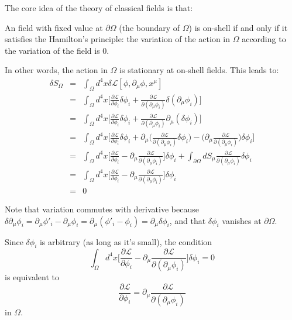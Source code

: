 \documentclass[12pt]{book}
\begin{document}
	The core idea of the theory of classical fields is that: 
	
	An field with fixed value at  $\partial\Omega$ (the boundary of $\Omega$) is on-shell if and only if it satisfies the  Hamilton's principle: the variation of the action in $\Omega$ according to the variation of the field is 0. 
	
	In other words, the action in $\Omega$ is stationary at on-shell fields. This leads to:
	\begin{eqnarray}
		\delta S_\Omega&=&\int_{\Omega}d^4x\delta\mathcal{L}[\phi,\partial_\mu\phi,x^\mu] \\
		&=&\int_{\Omega}d^4x\Big[\frac{\partial\mathcal{L}}{\partial\phi_i}\delta\phi_i+\frac{\partial\mathcal{L}}{\partial(\partial_\mu\phi_i)}\delta(\partial_\mu\phi_i)\Big]\\
		&=&\int_{\Omega}d^4x\Big[\frac{\partial\mathcal{L}}{\partial\phi_i}\delta\phi_i+\frac{\partial\mathcal{L}}{\partial(\partial_\mu\phi_i)}\partial_\mu(\delta\phi_i)\Big]\\
		&=&\int_{\Omega}d^4x\Big[\frac{\partial\mathcal{L}}{\partial\phi_i}\delta\phi_i+\partial_\mu\Big(\frac{\partial\mathcal{L}}{\partial(\partial_\mu\phi_i)}\delta\phi_i\Big)-\Big(\partial_\mu\frac{\partial\mathcal{L}}{\partial(\partial_\mu\phi_i)}\Big)\delta\phi_i\Big]	\\	&=&\int_{\Omega}d^4x\Big[\frac{\partial\mathcal{L}}{\partial\phi_i}-\partial_\mu\frac{\partial\mathcal{L}}{\partial(\partial_\mu\phi_i)}\Big]\delta\phi_i+\int_{\partial\Omega}dS_\mu\frac{\partial\mathcal{L}}{\partial(\partial_\mu\phi_i)}\delta\phi_i\\
		&=&\int_{\Omega}d^4x\Big[\frac{\partial\mathcal{L}}{\partial\phi_i}-\partial_\mu\frac{\partial\mathcal{L}}{\partial(\partial_\mu\phi_i)}\Big]\delta\phi_i \label{eqn:action-el}\\
		&=&0
	\end{eqnarray}
	
	Note that variation commutes with derivative because $\delta\partial_\mu\phi_i=\partial_\mu\phi'_i-\partial_\mu\phi_i=\partial_\mu(\phi'_i-\phi_i)=\partial_\mu\delta\phi_i$, and that $\delta \phi_i$ vanishes at $\partial\Omega$.
	
	Since $\delta\phi_i$ is arbitrary (as long as it's small), the condition
	\begin{equation}
		\int_{\Omega}d^4x\Big[\frac{\partial\mathcal{L}}{\partial\phi_i}-\partial_\mu\frac{\partial\mathcal{L}}{\partial(\partial_\mu\phi_i)}\Big]\delta\phi_i=0
	\end{equation}
	is equivalent to
	\begin{equation}
		\frac{\partial\mathcal{L}}{\partial\phi_i}=\partial_\mu\frac{\partial\mathcal{L}}{\partial(\partial_\mu\phi_i)}\label{eqn:E-L}
	\end{equation}
	in $\Omega$.
	
\end{document}
